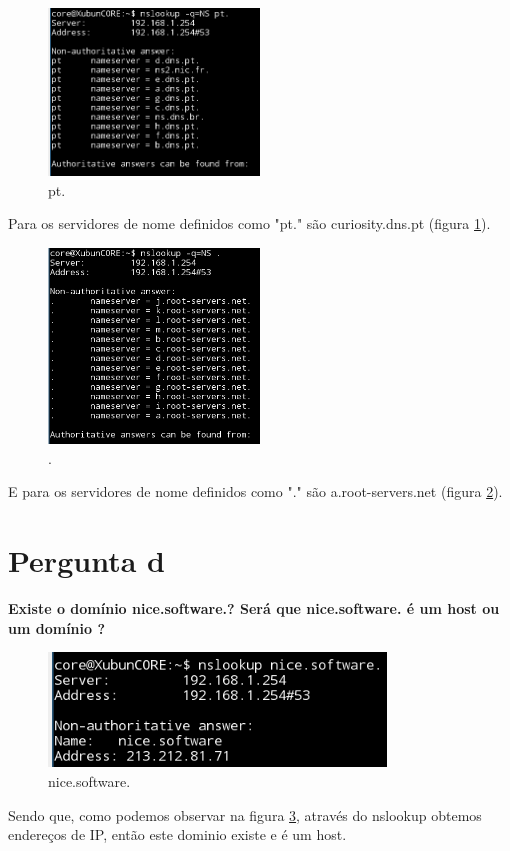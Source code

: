 \documentclass[a4paper]{report}
\begin{document}
\begin{figure}[H]
    \centering 
    \includegraphics[width=0.5\textwidth]{images/ptponto.png}  
    \caption{pt.}
    \label{fig:ptponto}
\end{figure}
Para os servidores de nome definidos como "pt." são curiosity.dns.pt
(figura \ref{fig:ptponto}).

\begin{figure}[H]
    \centering 
    \includegraphics[width=0.5\textwidth]{images/ponto.png}  
    \caption{.}
    \label{fig:ponto}
\end{figure}
E para os servidores de nome definidos como "." são a.root-servers.net
(figura \ref{fig:ponto}).

\section{Pergunta d}
\textbf{Existe o domínio nice.software.? Será que nice.software. é um host ou um
domínio ?}

\begin{figure}[H]
    \centering 
    \includegraphics[width=0.8\textwidth]{images/nicesoftware.png}  
    \caption{nice.software.}
    \label{fig:nicesoftware}
\end{figure}
Sendo que, como podemos observar na figura \ref{fig:nicesoftware}, através do nslookup
obtemos endereços de IP, então este dominio existe e é um host.
\end{document}
